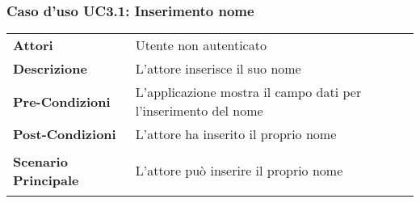 \subsubsection{Caso d'uso UC3.1: Inserimento nome}
\label{UC3_1}

\begin{longtable}{ l | p{11cm}}
	\hline
	\rowcolor{Gray}
	 \multicolumn{2}{c}{UC3.1 - Inserimento nome} \\
	 \hline
	\textbf{Attori} & Utente non autenticato \\
	\textbf{Descrizione} & L'attore inserisce il suo nome \\
	\textbf{Pre-Condizioni} & L'applicazione mostra il campo dati per l'inserimento del nome \\
	\textbf{Post-Condizioni} & L'attore ha inserito il proprio nome \\
	\textbf{Scenario Principale} & \begin{enumerate*}[label=(\arabic*.),itemjoin={\newline}]
		\item L'attore può inserire il proprio nome
	\end{enumerate*}\\
\end{longtable}